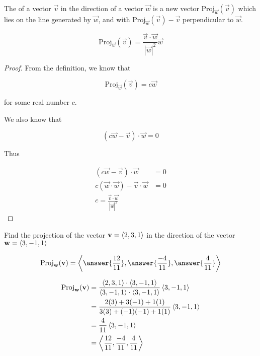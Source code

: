 \documentclass{ximera}
\begin{document}
\begin{definition}
	The  of a vector $\vec{v}$ in the direction of a vector $\vec{w}$ is a new vector $\textrm{Proj}_\vec{w}(\vec{v})$ which lies on the line generated by $\vec{w}$, and with $\textrm{Proj}_\vec{w}(\vec{v}) - \vec{v}$ perpendicular to $\vec{w}$.
\end{definition}

\begin{theorem}
	\[\textrm{Proj}_\vec{w}(\vec{v}) =\frac{\vec{v} \cdot \vec{w}}{|\vec{w}|^2} \vec{w}\]
\end{theorem}

\begin{proof}
	From the definition, we know that 
	
	\[
	\textrm{Proj}_\vec{w}(\vec{v}) = c \vec{w}
	\]
	
	for some real number $c$.
	
	We also know that 
	
	\[
	(c\vec{w} - \vec{v})\cdot \vec{w} = 0
	\]
		
	Thus
	
	\begin{align*}
		(c\vec{w} - \vec{v})\cdot \vec{w} &= 0\\
		c(\vec{w} \cdot \vec{w}) - \vec{v} \cdot \vec{w} &=0\\
		c = \frac{\vec{v} \cdot \vec{w}}{|\vec{w}|^2}
	\end{align*}
\end{proof}

\begin{question}
	Find the projection of the vector $\mathbf{v} = \left\langle 2,3,1\right\rangle$ in the direction of the vector $\mathbf{w} = \left\langle 3,-1,1\right\rangle$
	
	\[
	\textrm{Proj}_\vec{w}(\vec{v}) = \vector{\answer{\frac{12}{11}},\answer{\frac{-4}{11}},\answer{\frac{4}{11}}}
	\]
	
	\begin{hint}
	\begin{align*}
		\textrm{Proj}_\mathbf{w}(\mathbf{v}) &= \frac{\left\langle 2,3,1\right\rangle \cdot \left\langle 3,-1,1\right\rangle}{\left\langle 3,-1,1\right\rangle \cdot \left\langle 3,-1,1\right\rangle} \left\langle 3,-1,1\right\rangle\\
			&=\frac{2(3)+3(-1)+1(1)}{3(3)+(-1)(-1)+1(1)} \left\langle 3,-1,1\right\rangle\\
			&=\frac{4}{11}\left\langle 3,-1,1\right\rangle\\
			&=\left\langle \frac{12}{11},\frac{-4}{11},\frac{4}{11}\right\rangle
	\end{align*}
	\end{hint}
\end{question}
\end{document}
